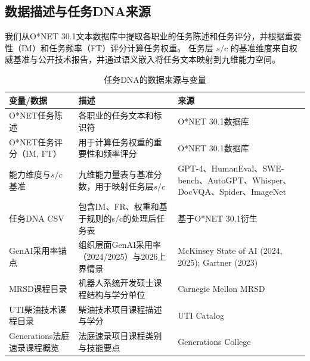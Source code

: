 \subsection{数据描述与任务DNA来源}
我们从O*NET 30.1文本数据库中提取各职业的任务陈述和任务评分，并根据重要性（IM）和任务频率（FT）评分计算任务权重。\cite{onet2025database}
任务层 $s/c$ 的基准维度来自权威基准与公开技术报告，并通过语义嵌入将任务文本映射到九维能力空间。\cite{openai2023gpt4,openaicodex2021,swebench2024,autogpt2023,whisper2022,docvqa2017,spider2018,imagenet2009}

\begin{table}[H]
\centering
\caption{任务DNA的数据来源与变量}
\label{tab:data_sources_task_dna}
\begin{tabular}{@{}p{3.4cm} p{7.4cm} p{3.2cm}@{}}
\toprule
变量/数据 & 描述 & 来源 \\
\midrule
O*NET任务陈述 & 各职业的任务文本和标识符 & O*NET 30.1数据库\newline \cite{onet2025database} \\
O*NET任务评分（IM, FT） & 用于计算任务权重的重要性和频率评分 & O*NET 30.1数据库\newline \cite{onet2025database} \\
能力维度与$s/c$基准 & 九维能力量表与基准分数，用于映射任务层$s/c$ & GPT-4、HumanEval、SWE-bench、AutoGPT、Whisper、DocVQA、Spider、ImageNet\newline \cite{openai2023gpt4,openaicodex2021,swebench2024,autogpt2023,whisper2022,docvqa2017,spider2018,imagenet2009} \\
任务DNA CSV & 包含IM、FR、权重和基于规则的s/c的处理后任务表 & 基于O*NET 30.1衍生\newline \cite{onet2025database} \\
GenAI采用率锚点 & 组织层面GenAI采用率（2024/2025）与2026上界情景 & McKinsey State of AI (2024, 2025); Gartner (2023)\newline \cite{mckinsey2024stateai,mckinsey2025stateai,gartner2023genai} \\
MRSD课程目录 & 机器人系统开发硕士课程结构与学分单位 & Carnegie Mellon MRSD\newline \cite{cmu2025mrsd} \\
UTI柴油技术课程目录 & 柴油技术项目课程描述与学分 & UTI Catalog\newline \cite{uti2026dieselcatalog} \\
Generations法庭速录课程概览 & 法庭速录项目课程类别与技能要点 & Generations College\newline \cite{generations2026courtreporting} \\
\bottomrule
\end{tabular}
\end{table}
